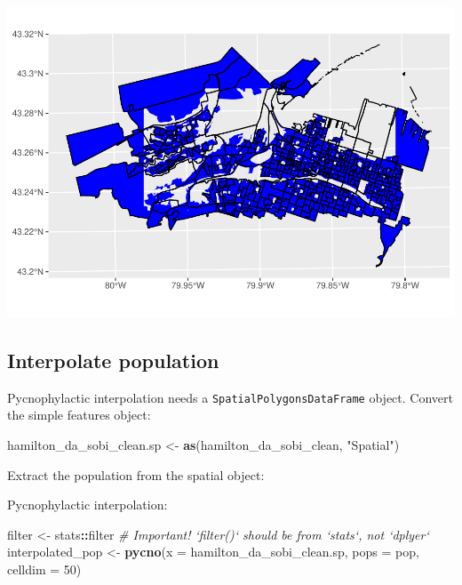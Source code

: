 \documentclass[
]{article}
\newenvironment{Shaded}{\begin{snugshade}}{\end{snugshade}}
\newcommand{\CommentTok}[1]{\textcolor[rgb]{0.56,0.35,0.01}{\textit{#1}}}
\newcommand{\DataTypeTok}[1]{\textcolor[rgb]{0.13,0.29,0.53}{#1}}
\newcommand{\DecValTok}[1]{\textcolor[rgb]{0.00,0.00,0.81}{#1}}
\newcommand{\KeywordTok}[1]{\textcolor[rgb]{0.13,0.29,0.53}{\textbf{#1}}}
\newcommand{\NormalTok}[1]{#1}
\newcommand{\OperatorTok}[1]{\textcolor[rgb]{0.81,0.36,0.00}{\textbf{#1}}}
\newcommand{\StringTok}[1]{\textcolor[rgb]{0.31,0.60,0.02}{#1}}
\begin{document}
\includegraphics{00-Data-Processing-Example_files/figure-latex/unnamed-chunk-74-1.pdf}

\hypertarget{interpolate-population}{%
\subsection{Interpolate population}\label{interpolate-population}}

Pycnophylactic interpolation needs a \texttt{SpatialPolygonsDataFrame}
object. Convert the simple features object:

\begin{Shaded}
\begin{Highlighting}[]
\NormalTok{hamilton_da_sobi_clean.sp <-}\StringTok{ }\KeywordTok{as}\NormalTok{(hamilton_da_sobi_clean, }\StringTok{"Spatial"}\NormalTok{)}
\end{Highlighting}
\end{Shaded}

Extract the population from the spatial object:

\begin{Shaded}
\end{Shaded}

Pycnophylactic interpolation:

\begin{Shaded}
\begin{Highlighting}[]
\NormalTok{filter <-}\StringTok{ }\NormalTok{stats}\OperatorTok{::}\NormalTok{filter }\CommentTok{# Important! `filter()` should be from `stats`, not `dplyer`}
\NormalTok{interpolated_pop <-}\StringTok{ }\KeywordTok{pycno}\NormalTok{(}\DataTypeTok{x =}\NormalTok{ hamilton_da_sobi_clean.sp, }\DataTypeTok{pops =}\NormalTok{ pop, }\DataTypeTok{celldim =} \DecValTok{50}\NormalTok{)}
\end{Highlighting}
\end{Shaded}
\end{document}
